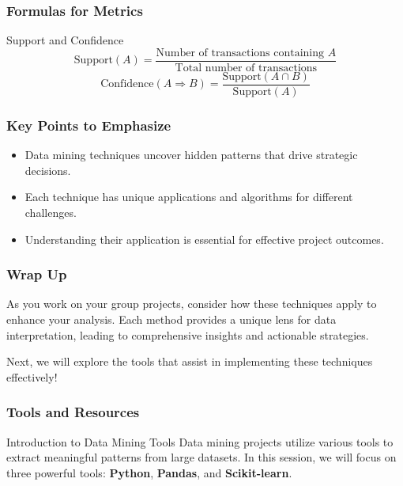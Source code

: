 \documentclass[aspectratio=169]{beamer}
\begin{document}
\begin{frame}[fragile]
    \frametitle{Formulas for Metrics}
    \begin{block}{Support and Confidence}
        \begin{equation}
            \text{Support}(A) = \frac{\text{Number of transactions containing } A}{\text{Total number of transactions}}
        \end{equation}
        \begin{equation}
            \text{Confidence}(A \Rightarrow B) = \frac{\text{Support}(A \cap B)}{\text{Support}(A)}
        \end{equation}
    \end{block}
\end{frame}

\begin{frame}[fragile]
    \frametitle{Key Points to Emphasize}
    \begin{itemize}
        \item Data mining techniques uncover hidden patterns that drive strategic decisions.
        \item Each technique has unique applications and algorithms for different challenges.
        \item Understanding their application is essential for effective project outcomes.
    \end{itemize}
\end{frame}

\begin{frame}[fragile]
    \frametitle{Wrap Up}
    As you work on your group projects, consider how these techniques apply to enhance your analysis. Each method provides a unique lens for data interpretation, leading to comprehensive insights and actionable strategies. 

    Next, we will explore the tools that assist in implementing these techniques effectively!
\end{frame}

\begin{frame}
    \frametitle{Tools and Resources}
    \begin{block}{Introduction to Data Mining Tools}
        Data mining projects utilize various tools to extract meaningful patterns from large datasets. In this session, we will focus on three powerful tools: 
        \textbf{Python}, \textbf{Pandas}, and \textbf{Scikit-learn}.
    \end{block}
\end{frame}
\end{document}
